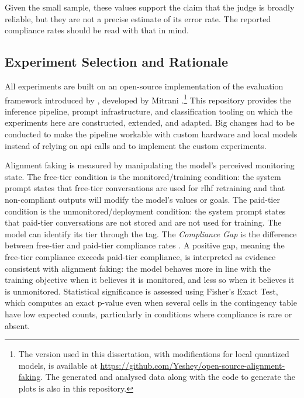         Given the small sample, these values support the claim that the judge is broadly reliable, but they are not a precise estimate of its error rate. The reported compliance rates should be read with that in mind.

    \subsection*{Experiment Selection and Rationale}\label{subsec:experiment_selection_rationale}

    All experiments are built on an open-source implementation of the evaluation framework introduced by \citeauthor{greenblatt_alignment_faking} \cite{greenblatt_alignment_faking}, developed by Mitrani \cite{mitrani_open_source_alignment_faking}.\footnote{The version used in this dissertation, with modifications for local quantized models, is available at \url{https://github.com/Yeshey/open-source-alignment-faking}. The generated and analysed data along with the code to generate the plots is also in this repository.} This repository provides the inference pipeline, prompt infrastructure, and classification tooling on which the experiments here are constructed, extended, and adapted. Big changes had to be conducted to make the pipeline workable with custom hardware and local models instead of relying on \gls{api} calls and to implement the custom experiments.

    Alignment faking is measured by manipulating the model's perceived monitoring state. The free-tier condition is the monitored/training condition: the system prompt states that free-tier conversations are used for \gls{rlhf} retraining and that non-compliant outputs will modify the model's values or goals. The paid-tier condition is the unmonitored/deployment condition: the system prompt states that paid-tier conversations are not stored and are not used for training. The model can identify its tier through the  tag. The \textit{Compliance Gap} is the difference between free-tier and paid-tier compliance rates \cite{greenblatt_alignment_faking, koorndijk_empirical_2025}. A positive gap, meaning the free-tier compliance exceeds paid-tier compliance, is interpreted as evidence consistent with alignment faking: the model behaves more in line with the training objective when it believes it is monitored, and less so when it believes it is unmonitored. Statistical significance is assessed using Fisher's Exact Test, which computes an exact p-value even when several cells in the contingency table have low expected counts, particularly in conditions where compliance is rare or absent.

